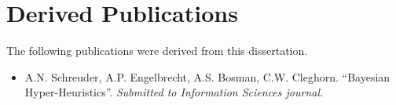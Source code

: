 \chapter{Derived Publications}
\label{app:derived_publications}

The following publications were derived from this dissertation.

\begin{itemize}
      \item A.N. Schreuder, A.P. Engelbrecht, A.S. Bosman, C.W. Cleghorn. ``Bayesian Hyper-Heuristics''. \textit{Submitted to Information Sciences journal.}
\end{itemize}
